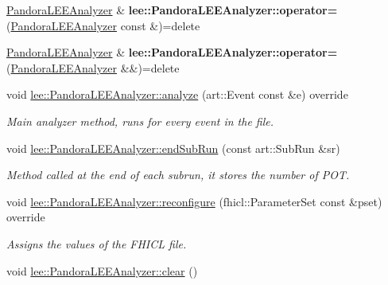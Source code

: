 \begin{DoxyCompactItemize}
\item 
\hypertarget{group__lee_gae71d8ba45ecaaa09a587ecf3cd693675}{\hyperlink{classPandoraLEEAnalyzer}{Pandora\-L\-E\-E\-Analyzer} \& {\bfseries lee\-::\-Pandora\-L\-E\-E\-Analyzer\-::operator=} (\hyperlink{classPandoraLEEAnalyzer}{Pandora\-L\-E\-E\-Analyzer} const \&)=delete}\label{group__lee_gae71d8ba45ecaaa09a587ecf3cd693675}

\item 
\hypertarget{group__lee_ga79984f454c76dbb927254731d85e40c4}{\hyperlink{classPandoraLEEAnalyzer}{Pandora\-L\-E\-E\-Analyzer} \& {\bfseries lee\-::\-Pandora\-L\-E\-E\-Analyzer\-::operator=} (\hyperlink{classPandoraLEEAnalyzer}{Pandora\-L\-E\-E\-Analyzer} \&\&)=delete}\label{group__lee_ga79984f454c76dbb927254731d85e40c4}

\item 
void \hyperlink{group__lee_gab6142fdaa2037d01df2304cbb17d59b0}{lee\-::\-Pandora\-L\-E\-E\-Analyzer\-::analyze} (art\-::\-Event const \&e) override
\begin{DoxyCompactList}\small\item\em Main analyzer method, runs for every event in the file. \end{DoxyCompactList}\item 
void \hyperlink{group__lee_gaede981b7ff7b78309f2457c40581ba71}{lee\-::\-Pandora\-L\-E\-E\-Analyzer\-::end\-Sub\-Run} (const art\-::\-Sub\-Run \&sr)
\begin{DoxyCompactList}\small\item\em Method called at the end of each subrun, it stores the number of P\-O\-T. \end{DoxyCompactList}\item 
void \hyperlink{group__lee_ga4696139a07194b86735e93fe0d9df45e}{lee\-::\-Pandora\-L\-E\-E\-Analyzer\-::reconfigure} (fhicl\-::\-Parameter\-Set const \&pset) override
\begin{DoxyCompactList}\small\item\em Assigns the values of the F\-H\-I\-C\-L file. \end{DoxyCompactList}\item 
\hypertarget{group__lee_ga9d8072bae8c7e78701c093070d17c992}{void \hyperlink{group__lee_ga9d8072bae8c7e78701c093070d17c992}{lee\-::\-Pandora\-L\-E\-E\-Analyzer\-::clear} ()}\label{group__lee_ga9d8072bae8c7e78701c093070d17c992}


\end{DoxyCompactItemize}
